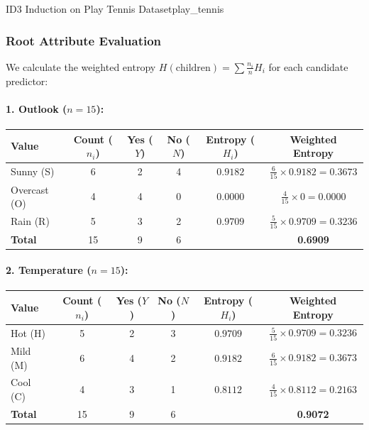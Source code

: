 \begin{example}{ID3 Induction on Play Tennis Dataset}{play_tennis}
\subsubsection{Root Attribute Evaluation}
We calculate the weighted entropy $H(\text{children}) = \sum \frac{n_i}{n} H_i$ for each candidate predictor:

\paragraph{1. Outlook ($n = 15$):}
\begin{center}\small\renewcommand{\arraystretch}{1.35}
\begin{tabular}{lccccc}
\toprule
\textbf{Value} & \textbf{Count ($n_i$)} & \textbf{Yes ($Y$)} & \textbf{No ($N$)} & \textbf{Entropy ($H_i$)} & \textbf{Weighted Entropy} \\
\midrule
Sunny (S)    & 6 & 2 & 4 & $0.9182$ & $\frac{6}{15} \times 0.9182 = 0.3673$ \\
Overcast (O) & 4 & 4 & 0 & $0.0000$ & $\frac{4}{15} \times 0 = 0.0000$ \\
Rain (R)     & 5 & 3 & 2 & $0.9709$ & $\frac{5}{15} \times 0.9709 = 0.3236$ \\
\midrule
\textbf{Total} & 15 & 9 & 6 & & \textbf{0.6909} \\
\bottomrule
\end{tabular}
\end{center}

\paragraph{2. Temperature ($n = 15$):}
\begin{center}\small\renewcommand{\arraystretch}{1.35}
\begin{tabular}{lccccc}
\toprule
\textbf{Value} & \textbf{Count ($n_i$)} & \textbf{Yes ($Y$)} & \textbf{No ($N$)} & \textbf{Entropy ($H_i$)} & \textbf{Weighted Entropy} \\
\midrule
Hot (H)  & 5 & 2 & 3 & $0.9709$ & $\frac{5}{15} \times 0.9709 = 0.3236$ \\
Mild (M) & 6 & 4 & 2 & $0.9182$ & $\frac{6}{15} \times 0.9182 = 0.3673$ \\
Cool (C) & 4 & 3 & 1 & $0.8112$ & $\frac{4}{15} \times 0.8112 = 0.2163$ \\
\midrule
\textbf{Total} & 15 & 9 & 6 & & \textbf{0.9072} \\
\bottomrule
\end{tabular}
\end{center}


\end{example}
